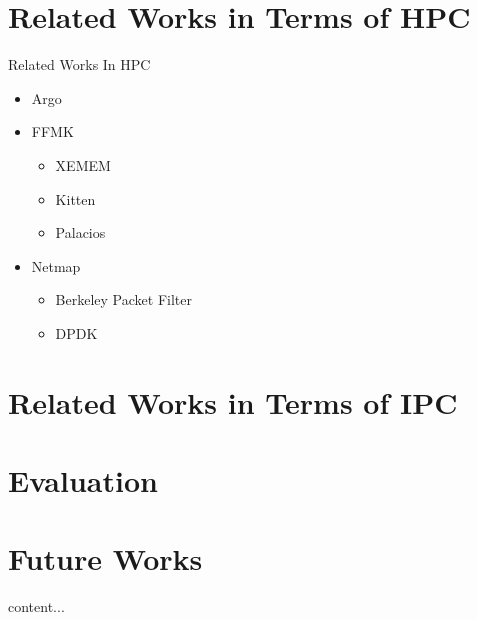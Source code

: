 \documentclass{beamer}
\begin{document}
	\section{Related Works in Terms of HPC}
	\begin{frame}{Related Works In HPC}
		\begin{itemize}
			\vspace{8pt} \item \alert{Argo}
			\vspace{8pt} \item \alert{FFMK}
			\begin{itemize}
				\vspace{8pt} \item XEMEM
				\vspace{8pt} \item Kitten
				\vspace{8pt} \item Palacios
			\end{itemize}
			\vspace{8pt} \item \alert{Netmap}
			\begin{itemize}
				\vspace{8pt} \item Berkeley Packet Filter
				\vspace{8pt} \item DPDK
			\end{itemize}
		\end{itemize}
	\end{frame}
	
	\section{Related Works in Terms of IPC}
	\section{Evaluation}
	\section{Future Works}
	content...
\end{document}
